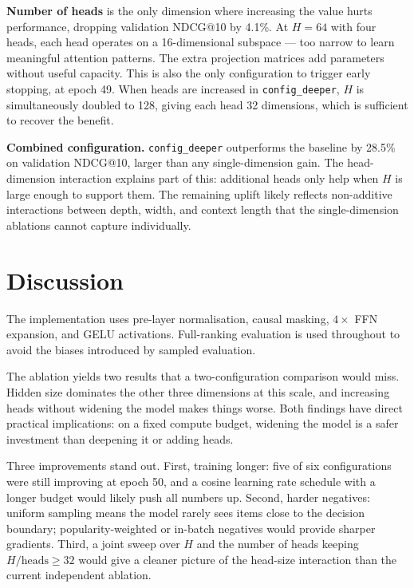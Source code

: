 \documentclass[sigconf]{acmart}
\begin{document}
\textbf{Number of heads} is the only dimension where increasing the value hurts
performance, dropping validation NDCG@10 by 4.1\%. At $H = 64$ with four heads,
each head operates on a 16-dimensional subspace --- too narrow to learn
meaningful attention patterns. The extra projection matrices add parameters
without useful capacity. This is also the only configuration to trigger early
stopping, at epoch 49. When heads are increased in \texttt{config\_deeper},
$H$ is simultaneously doubled to 128, giving each head 32 dimensions, which is
sufficient to recover the benefit.

\textbf{Combined configuration.} \texttt{config\_deeper} outperforms the
baseline by 28.5\% on validation NDCG@10, larger than any single-dimension
gain. The head-dimension interaction explains part of this: additional heads
only help when $H$ is large enough to support them. The remaining uplift likely
reflects non-additive interactions between depth, width, and context length that
the single-dimension ablations cannot capture individually.


\section{Discussion}

The implementation uses pre-layer normalisation, causal masking, $4\times$ FFN
expansion, and GELU activations. Full-ranking evaluation is used throughout to
avoid the biases introduced by sampled evaluation.

The ablation yields two results that a two-configuration comparison would miss.
Hidden size dominates the other three dimensions at this scale, and increasing
heads without widening the model makes things worse. Both findings have direct
practical implications: on a fixed compute budget, widening the model is a
safer investment than deepening it or adding heads.

Three improvements stand out. First, training longer: five of six configurations
were still improving at epoch 50, and a cosine learning rate schedule with a
longer budget would likely push all numbers up. Second, harder negatives:
uniform sampling means the model rarely sees items close to the decision
boundary; popularity-weighted or in-batch negatives would provide sharper
gradients. Third, a joint sweep over $H$ and the number of heads keeping
$H / \text{heads} \geq 32$ would give a cleaner picture of the head-size
interaction than the current independent ablation.
\end{document}
